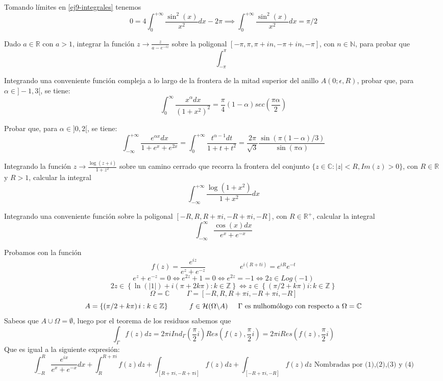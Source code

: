 Tomando límites en \ref{ej9-integrales} tenemos
$$ 0=4\int_{0}^{+\infty} \frac{\sin^2(x)}{x^2} dx -2\pi  \implies  \int_{0}^{+\infty} \frac{\sin^2(x)}{x^2}dx = \pi/2 $$

\begin{ejer}
	Dado $a\in\mathbb{R}$ con $a>1$, integrar la función $z\rightarrow \frac{z}{a-e^{-iz}}$ sobre la poligonal $[-\pi,\pi,\pi+in,-\pi+in,-\pi]$, con $n\in\mathbb{N}$, para probar que
	$$ \int_{-\pi}^{\pi} $$
\end{ejer}

\begin{ejer}
	Integrando una conveniente función compleja a lo largo de la frontera de la mitad superior del anillo $A(0;\epsilon,R)$, probar que, para $\alpha\in]-1,3[$, se tiene:
	$$ \int_{0}^{\infty} \frac{x^{\alpha}dx}{(1+x^2)^2} = \frac{\pi}{4}(1-\alpha)sec(\frac{\pi\alpha}{2}) $$
\end{ejer}

\begin{ejer}
	Probar que, para $\alpha\in ]0,2[$, se tiene:
	$$ \int_{-\infty}^{+\infty} \frac{e^{\alpha x}dx}{1+e^x+e^{2x}} = \int_{0}^{+\infty} \frac{t^{\alpha-1} dt}{1+t+t^2} = \frac{2\pi}{\sqrt{3}}\frac{\sin(\pi(1-\alpha)/3)}{\sin(\pi\alpha)} $$
\end{ejer}

\begin{ejer}
	Integrando la función $z\rightarrow\frac{\log(z+i)}{1+z^2}$ sobre un camino cerrado que recorra la frontera del conjunto $\{ z\in\mathbb{C} : |z|<R, Im(z)>0 \}$, con $R\in\mathbb{R}$ y $R>1$, calcular la integral
	$$ \int_{-\infty}^{+\infty} \frac{\log(1+x^2)}{1+x^2}dx $$
\end{ejer}


\begin{ejer}
	Integrando una conveniente función sobre la poligonal $[-R,R,R+\pi i,-R+\pi i, -R]$, con $R\in\mathbb{R}^+$, calcular la integral
	$$ \int_{-\infty}^{\infty} \frac{\cos(x)dx}{e^x+e^{-x}} $$
\end{ejer}
Probamos con la función
$$ f(z) = \frac{e^{iz}}{e^z+e^{-z}} \hspace{2cm} e^{i(R+ti)} = e^{iR}e^{-t} $$
$$ e^z+e^{-z} =0\Longleftrightarrow  e^{2z}+1=0 \Longleftrightarrow e^{2z}=-1 \Longleftrightarrow 2z\in Log(-1) $$
$$ 2z\in\left\{ \ln(|1|) + i(\pi+2k\pi) : k\in\mathbb{Z} \right\} \Longleftrightarrow z\in\left\{ (\pi/2+k\pi)i : k\in\mathbb{Z} \right\} $$
$$ \Omega=\mathbb{C} \hspace{1cm} \Gamma = [ -R,R,R+\pi i, -R+\pi i, -R ] $$
$$ A = \left\{ \left( \pi/2 +k\pi \right)i : k\in\mathbb{Z} \right\} \hspace{1cm} f\in\mathcal{H}(\Omega\backslash A) \hspace{0.5cm} \Gamma \text{ es nulhomólogo con respecto a }\Omega=\mathbb{C} $$
Sabeos que $A\cup\Omega = \emptyset$, luego por el teorema de los residuos sabemos que
$$ \int_{\Gamma} f(z)dz = 2\pi iInd_{\Gamma}(\frac{\pi}{2}i) Res(f(z), \frac{\pi}{2}i) = 2\pi i Res(f(z), \frac{\pi}{2}i)$$
Que es igual a la siguiente expresión:
$$ \int_{-R}^{R} \frac{e^{ix}}{e^x+e^{-x}} dx + \int_{R}^{R+\pi i} f(z)dz + \int_{[R+\pi i,-R+\pi i]} f(z)dz + \int_{[-R+\pi i, -R]} f(z)dz \text{ Nombradas por (1),(2),(3) y (4)} $$

